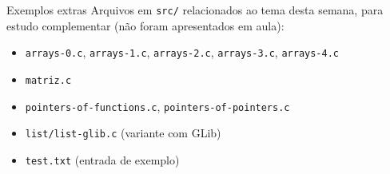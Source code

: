 \documentclass{beamer}
\begin{document}
\begin{frame}{Exemplos extras}
  Arquivos em \texttt{src/} relacionados ao tema desta semana, para
  estudo complementar (não foram apresentados em aula):
  \begin{itemize}
    \item \texttt{arrays-0.c}, \texttt{arrays-1.c}, \texttt{arrays-2.c},
          \texttt{arrays-3.c}, \texttt{arrays-4.c}
    \item \texttt{matriz.c}
    \item \texttt{pointers-of-functions.c}, \texttt{pointers-of-pointers.c}
    \item \texttt{list/list-glib.c} (variante com GLib)
    \item \texttt{test.txt} (entrada de exemplo)
  \end{itemize}
\end{frame}
\end{document}
